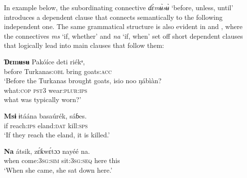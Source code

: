 In example  below, the subordinating connective \textit{ɗ\`{ɛ}m\`{ʉ}s\`{ʉ}} ‘before, unless, until’ introduces a dependent clause that connects semantically to the following independent one. The same grammatical structure is also evident in  and , where the connectives \textit{m{\Í}s{\Ì}} ‘if, whether’ and \textit{na} ‘if, when’ set off short dependent clauses that logically lead into main clauses that follow them:



\ea\label{ex:morph:14}
  \ea
  \gll \textbf{Ɗ{ɛmʉsʉ}}   Pakóíce     deti   riékᵃ, \\
before   Turkanas:\textsc{obl}   bring   goats:\textsc{acc}    \\ 
  \glt ‘Before the Turkanas brought goats,
  \medskip
  \ex
  \gll isio     noo   ŋábìàn? \\
  what:\textsc{cop}   \textsc{pst3}   wear:\textsc{plur:ips}    \\
  \glt  what was typically worn?’ 
  \z
\z




\ea\label{ex:morph:15}
\gll \textbf{M{\Í}sɨ}   ɨtáána   basaúrék{\ᵉ},   sáɓes. \\
if   reach:\textsc{ips}   eland:\textsc{dat}   kill:\textsc{sps}   \\
\glt ‘If they reach the eland, it is killed.’ 
\z




\ea\label{ex:morph:16}
\gll \textbf{Na}   átsik{\ᵉ},       z\'{ɛ}ƙw\'{ɛ}tɔɔ   nayéé   na. \\
 when   come:\textsc{3sg:sim}   sit:\textsc{3sg:seq}   here   this   \\
\glt ‘When she came, she sat down here.’ 
\z




